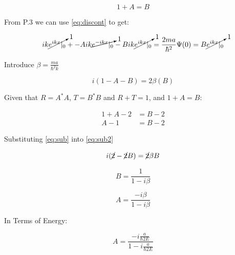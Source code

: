 \documentclass[12pt]{article}
\begin{document}
\begin{equation}
  1+A=B
\end{equation}

From P.3 we can use \eqref{eq:discont} to get:

\begin{equation}
  ik\cancelto{1}{e^{ikx}\rvert_{0}}+-Aik\cancelto{1}{e^{-ikx}\rvert_0}-Bik\cancelto{1}{e^{ikx}\rvert_0}=\frac{2ma}{\hbar^2}\Psi(0)=B\cancelto{1}{e^{ikx}\rvert_0}
\end{equation}

Introduce $\beta=\frac{ma}{\hbar^2k}$

\begin{equation}\label{eq:sub2}
  i(1-A-B)=2\beta(B)
\end{equation}

Given that $R=A^*A$, $T=B^*B$ and $R+T=1$, and $1+A=B$:

\begin{equation}\label{eq:sub}
  \begin{split}
    1+A-2&=B-2\\
    A-1&=B-2
  \end{split}
\end{equation}

Substituting \eqref{eq:sub} into \eqref{eq:sub2}

\begin{equation}
  i(\cancel2-\cancel2B)=\cancel2\beta{}B
\end{equation}

\begin{equation}
  B=\frac{1}{1-i\beta}
\end{equation}

\begin{equation}
  A=\frac{-i\beta}{1-i\beta}
\end{equation}

In Terms of Energy:

\begin{equation}
  A=\frac{-i \frac{a}{\hbar{}2E} }{1-i \frac{a}{\hbar{}2E} }
\end{equation}
\end{document}
